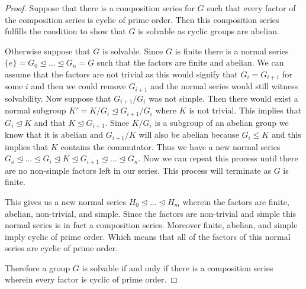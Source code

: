 \documentclass[10pt]{article}
\newcommand{\sk}{\vskip 10mm}
\theoremstyle{plain}
\theoremstyle{remark}
\begin{document}
\begin{proof}
  Suppose that there is a composition series for $G$ such that
  every factor of the composition series is cyclic of prime order. Then this
  composition series fulfills the condition to show that $G$ is solvable as
  cyclic groups are abelian.

  Otherwise suppose that $G$ is solvable. Since $G$ is finite there is a normal series
  \\$\{e\}=G_0\trianglelefteq \ldots\trianglelefteq G_n=G$ such that the factors
  are finite and abelian. We can assume that the factors are not trivial as this
  would signify that $G_i=G_{i+1}$ for some $i$ and then we could remove $G_{i+1}$
  and the normal series would still witness solvability. Now suppose that
  $G_{i+1}/G_i$ was not simple. Then there would exist a normal subgroup
  $K'=K/G_i\trianglelefteq G_{i+1}/G_i$ where $K$ is not trivial.
  This implies that $G_i\trianglelefteq K$
  and that $K\trianglelefteq G_{i+1}$. Since $K/G_i$ is a subgroup of an abelian
  group we know that it is abelian and $G_{i+1}/K$ will also be abelian because
  $G_i\leq K$ and this implies that $K$ contains the commutator. Thus we have a new
  normal series $G_o\trianglelefteq\ldots\trianglelefteq G_i\trianglelefteq K
  \trianglelefteq G_{i+1}\trianglelefteq\ldots\trianglelefteq G_n$. Now we can
  repeat this process until there are no non-simple factors left in our series.
  This process will terminate as $G$ is finite.

  This gives us a new normal series $H_0\trianglelefteq\ldots\trianglelefteq H_m$
  wherein the factors are finite, abelian, non-trivial, and simple. Since
  the factors are non-trivial and simple this normal series is in fact
  a composition series. Moreover finite, abelian, and simple imply cyclic
  of prime order. Which means that all of the factors of this normal
  series are cyclic of prime order.

  Therefore a group $G$ is solvable if and only if there is a composition
  series wherein every factor is cyclic of prime order.
\end{proof}

\sk
\end{document}

